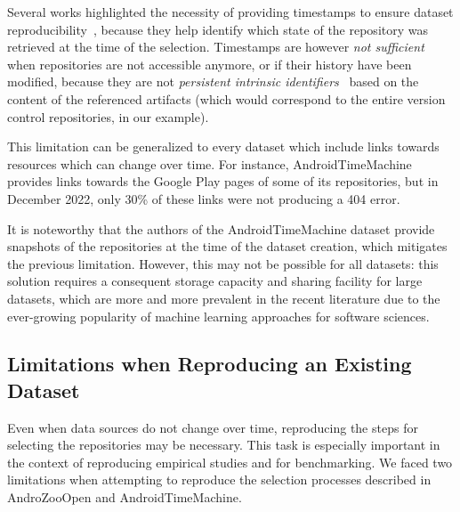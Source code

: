 Several works highlighted the necessity of providing timestamps to ensure dataset reproducibility~\cite{tutko2022software, vial2019reflections, kalliamvakou2016depth}, because they help identify which state of the repository was retrieved at the time of the selection. %
Timestamps are however \emph{not sufficient} when repositories are not accessible anymore, or if their history have been modified, because they are not \emph{persistent intrinsic identifiers}~\cite{DBLP:journals/cse/CosmoGZ20} based on the content of the referenced artifacts (which would correspond to the entire version control repositories, in our example).

This limitation can be generalized to every dataset which include links towards resources which can change over time. For instance, AndroidTimeMachine provides links towards the Google Play pages of some of its repositories, but in December 2022, only 30\% of these links were not producing a 404 error.

It is noteworthy that the authors of the AndroidTimeMachine dataset provide snapshots of the repositories at the time of the dataset creation, which mitigates the previous limitation. However, this may not be possible for all datasets: this solution requires a consequent storage capacity and sharing facility for large datasets, which are more and more prevalent in the recent literature due to the ever-growing popularity of machine learning approaches for software sciences. 
\vspace{-1 em}
\subsection{Limitations when Reproducing an Existing Dataset}

Even when data sources do not change over time, reproducing the steps for selecting the repositories may be necessary. 
This task is especially important in the context of reproducing empirical studies and for benchmarking.
We faced two limitations when attempting to reproduce the selection processes described in AndroZooOpen and AndroidTimeMachine.
  \newline
  
